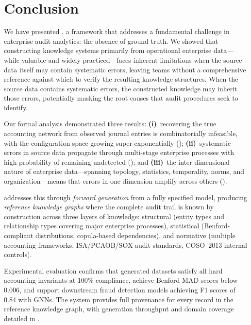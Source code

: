 \section{Conclusion}
\label{sec:conclusion}

We have presented \system{}, a framework that addresses a fundamental
challenge in enterprise audit analytics: the absence of ground truth.
We showed that constructing knowledge systems primarily from operational enterprise
data---while valuable and widely practiced---faces inherent
limitations when the source data itself may contain systematic errors,
leaving teams without a comprehensive reference against which to
verify the resulting knowledge structures.  When the source data contains systematic errors, the
constructed knowledge may inherit those errors, potentially masking the
root causes that audit procedures seek to identify.

Our formal analysis demonstrated three results:
\textbf{(i)}~recovering the true accounting network from observed
journal entries is combinatorially infeasible, with the configuration
space growing super-exponentially ();
\textbf{(ii)}~systematic errors in source data propagate through
multi-stage enterprise processes with high probability of remaining
undetected (); and
\textbf{(iii)}~the inter-dimensional nature of enterprise data---spanning
topology, statistics, temporality, norms, and organization---means that
errors in one dimension amplify across others
().

\system{} addresses this through \emph{forward generation} from a
fully specified model, producing \emph{reference knowledge graphs}
where the complete audit trail is known by construction across three
layers of knowledge: structural (entity types and relationship types
covering major enterprise processes), statistical (Benford-compliant
distributions, copula-based dependencies), and normative (multiple
accounting frameworks, ISA/PCAOB/SOX audit standards, COSO~2013
internal controls).

Experimental evaluation confirms that generated datasets satisfy all
hard accounting invariants at 100\% compliance, achieve Benford MAD
scores below 0.006, and support downstream fraud detection models
achieving F1 scores of 0.84 with GNNs.  The system provides full provenance for every record in the reference
knowledge graph, with generation throughput and domain coverage detailed
in .

